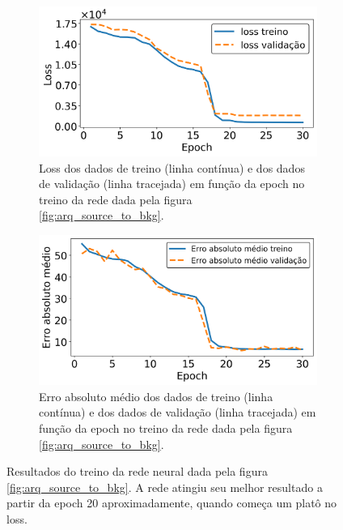 \documentclass[a4paper,12pt,oneside]{book}
\begin{document}
\begin{figure}[H]
\centering
    \begin{subfigure}[t]{\textwidth}
        \centering
        \includegraphics[scale=0.51]{figs/source_to_bkg_loss.png}
        \caption{Loss dos dados de treino (linha contínua) e dos dados de validação (linha tracejada) em função da epoch no treino da rede dada pela figura \ref{fig:arq_source_to_bkg}.}
        \label{subfig:source_to_bkg_loss}
    \end{subfigure}%
    \vfill
    \begin{subfigure}[t]{\textwidth}
        \centering
        \includegraphics[scale=0.51]{figs/source_to_bkg_metric.png}
        \caption{Erro absoluto médio dos dados de treino (linha contínua) e dos dados de validação (linha tracejada) em função da epoch no treino da rede dada pela figura \ref{fig:arq_source_to_bkg}.}
        \label{subfig:source_to_bkg_metric}
    \end{subfigure}
\caption{Resultados do treino da rede neural dada pela figura \ref{fig:arq_source_to_bkg}. A rede atingiu seu melhor resultado a partir da epoch 20 aproximadamente, quando começa um platô no loss.}
\label{fig:source_to_bkg_results}
\end{figure}
\end{document}
